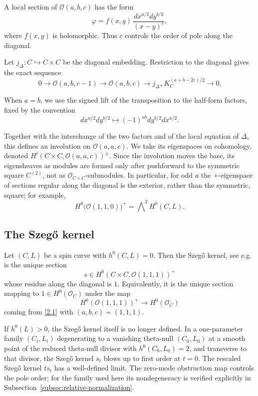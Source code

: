 \documentclass[10pt,a4paper]{amsart}
\newcommand{\OO}{\mathcal O}
\begin{document}
A local section of $\OO(a,b,c)$ has the form
\[
\varphi=f(x,y)\,\frac{dx^{a/2}dy^{b/2}}{(x-y)^c},
\]
where $f(x,y)$ is holomorphic. Thus $c$ controls the order of pole along the diagonal.

{Let $j_\Delta:C\hookrightarrow C\times C$ be the diagonal embedding.}
Restriction to the diagonal gives the exact sequence
\begin{equation} \label{2.1}
0\to \OO(a,b,c-1)\to \OO(a,b,c)\to {j_{\Delta*}K_C^{(a+b-2c)/2}}\to 0.
\end{equation}

When $a=b$, we use the signed lift of the transposition to the half-form factors, fixed by the convention
\begin{equation} \label{lift}
    dx^{a/2}dy^{b/2}\longmapsto(-1)^{ab}dy^{b/2}dx^{a/2}.
\end{equation}

Together with the interchange of the two factors and of the local equation of $\Delta$, this defines an involution on $\OO(a,a,c)$.
{We take its eigenspaces on cohomology, denoted
$H^i(C\times C,\OO(a,a,c))^\pm$. Since the involution moves the base,
its eigensheaves as modules are formed only after pushforward to the
symmetric square $C^{(2)}$, not as $\OO_{C\times C}$-submodules.}
In particular, for odd $a$ the $+$-eigenspace of sections regular along the diagonal is the exterior, rather than the symmetric, square; for example,
\[
{H^0\bigl(\OO(1,1,0)\bigr)^+}=\bigwedge\nolimits^2H^0(C,L).
\]

\subsection{The Szeg\H{o} kernel}

Let $(C,L)$ be a spin curve with $h^0(C,L)=0$.
Then the Szeg\H{o} kernel, see e.g. \cite{BZB, CV, FI, FKP} is the unique section
\[
s\in {H^0(C\times C,\OO(1,1,1))^+}
\]
whose residue along the diagonal is $1$. Equivalently, it is the unique section mapping to $1\in H^0(\OO_C)$ under the map
\[
{H^0(\OO(1,1,1))^+} \longrightarrow H^0(\OO_C)
\]
coming from \eqref{2.1} with $(a,b,c)=(1,1,1)$.

If $h^0(L)>0$, the Szeg\H{o} kernel itself is no longer defined.
In a one-parameter family $(C_t,L_t)$
degenerating to a vanishing theta-null $(C_0,L_0)$
{at a smooth point of the reduced theta-null divisor with $h^0(C_0,L_0)=2$, and transverse to that divisor,}
the Szeg\H{o} kernel $s_t$ blows up to first order at $t=0$.
The rescaled Szeg\H{o} kernel $ts_t$ has a well-defined limit.
{The zero-mode obstruction map controls the pole order; for the
family used here its nondegeneracy is verified explicitly in
Subsection~{\ref{subsec:relative-normalization}}.}
\end{document}

